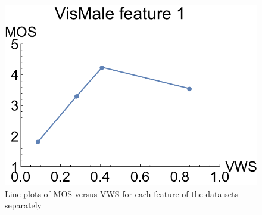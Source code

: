 \begin{figure}
\begin{minipage}{.25\textwidth}
		\includegraphics[width=1\linewidth]{figures/mos_vs_metric_VisMale_feature_1}
		\subcaption{}
	\end{minipage}
	\caption{Line plots of MOS versus VWS for each feature of the data sets separately}
	\label{fig:mos_vs_metric}
\end{figure}


